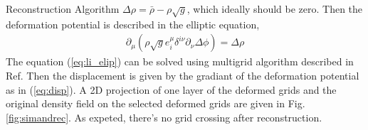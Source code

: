 \begin{section}{Reconstruction Algorithm}
$\Delta \rho = \bar{\rho}-\rho \sqrt{g}$, which ideally should be zero. Then the 
deformation potential is described in the elliptic equation,
\begin{align}
 \label{eq:li_elip}
    \partial _\mu (\rho \sqrt{g} e^\mu _i \delta^{i\nu}\partial_\nu \Delta \phi)=\Delta \rho
\end{align}
The equation (\ref{eq:li_elip}) can be solved using multigrid algorithm described in Ref. 
\cite{bib:Pen1995,bib:Pen1998} Then the displacement is given by the gradiant of the deformation 
potential as in (\ref{eq:disp}). A 2D projection of one layer of the deformed grids and the 
original density field on the selected deformed grids are given in Fig. \ref{fig:simandrec}. 
As expeted, there's no grid crossing after reconstruction.
%
\end{section}

